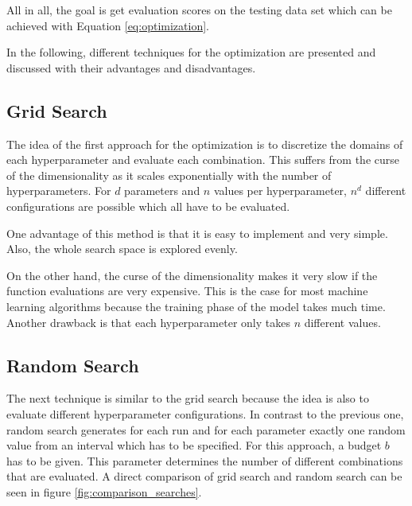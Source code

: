 All in all, the goal is get evaluation scores on the testing data set which can be achieved with Equation \ref{eq:optimization}. 
\cite{feurer2019hyperparameter,bischl2021hyperparameter,yang2020hyperparameter}

In the following, different techniques for the optimization are presented and discussed with their advantages and disadvantages.

\subsection{Grid Search}
The idea of the first approach for the optimization is to discretize the domains of each hyperparameter and evaluate each combination. This suffers from the curse of the dimensionality as it scales exponentially with the number of hyperparameters. For $ d $ parameters and $ n $ values per hyperparameter, $ n^d $ different configurations are possible which all have to be evaluated. 

One advantage of this method is that it is easy to implement and very simple. Also, the whole search space is explored evenly.

On the other hand, the curse of the dimensionality makes it very slow if the function evaluations are very expensive. This is the case for most machine learning algorithms because the training phase of the model takes much time. Another drawback is that each hyperparameter only takes $ n $ different values.


\subsection{Random Search}
The next technique \cite{random_search} is similar to the grid search because the idea is also to evaluate different hyperparameter configurations. In contrast to the previous one, random search generates for each run and for each parameter exactly one random value from an interval which has to be specified. For this approach, a budget $ b $ has to be given. This parameter determines the number of different combinations that are evaluated. A direct comparison of grid search and random search can be seen in figure \ref{fig:comparison_searches}.

